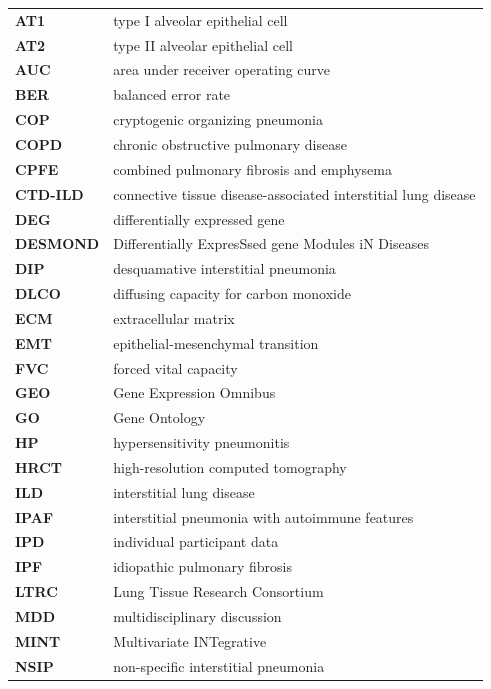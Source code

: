 \documentclass[
]{article}
\begin{document}
\begin{longtable}{>{}ll}

\textbf{AT1} & type I alveolar epithelial cell\\
\textbf{AT2} & type II alveolar epithelial cell\\
\textbf{AUC} & area under receiver operating curve\\
\textbf{BER} & balanced error rate\\
\textbf{COP} & cryptogenic organizing pneumonia\\
\addlinespace
\textbf{COPD} & chronic obstructive pulmonary disease\\
\textbf{CPFE} & combined pulmonary fibrosis and emphysema\\
\textbf{CTD-ILD} & connective tissue disease-associated interstitial lung disease\\
\textbf{DEG} & differentially expressed gene\\
\textbf{DESMOND} & Differentially ExpresSsed gene Modules iN Diseases\\
\addlinespace
\textbf{DIP} & desquamative interstitial pneumonia\\
\textbf{DLCO} & diffusing capacity for carbon monoxide\\
\textbf{ECM} & extracellular matrix\\
\textbf{EMT} & epithelial-mesenchymal transition\\
\textbf{FVC} & forced vital capacity\\
\addlinespace
\textbf{GEO} & Gene Expression Omnibus\\
\textbf{GO} & Gene Ontology\\
\textbf{HP} & hypersensitivity pneumonitis\\
\textbf{HRCT} & high-resolution computed tomography\\
\textbf{ILD} & interstitial lung disease\\
\addlinespace
\textbf{IPAF} & interstitial pneumonia with autoimmune features\\
\textbf{IPD} & individual participant data\\
\textbf{IPF} & idiopathic pulmonary fibrosis\\
\textbf{LTRC} & Lung Tissue Research Consortium\\
\textbf{MDD} & multidisciplinary discussion\\
\addlinespace
\textbf{MINT} & Multivariate INTegrative\\
\textbf{NSIP} & non-specific interstitial pneumonia\\

\end{longtable}
\end{document}
